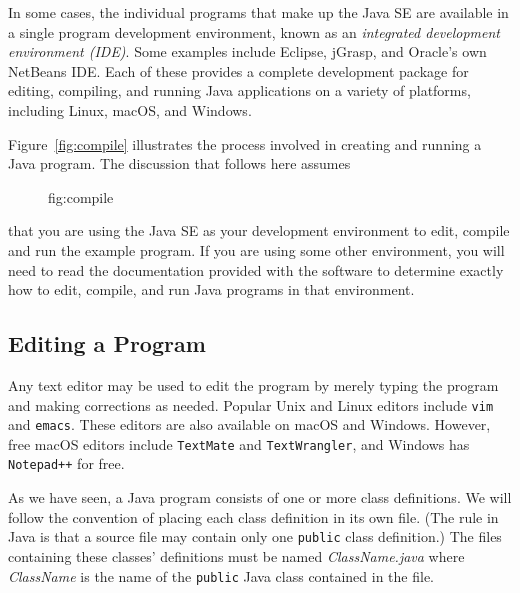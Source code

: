 In some cases, the individual programs that make up the Java SE are
available in a single program development environment, known as an
{\it integrated development environment (IDE)}. Some examples include
Eclipse, jGrasp, and Oracle's own NetBeans
IDE.  Each of these provides a complete development package for
editing, compiling, and running Java applications on
a variety of platforms, including Linux, macOS, and Windows.

Figure~\ref{fig:compile} illustrates the process involved in creating
and running a Java program.  The discussion that follows here assumes
\begin{figure}[tb]
\figaleft{chptr01/compile.eps}{Editing, compiling, and running
{\tt HelloWorld.java}.
} {fig:compile}

\end{figure}
that you are using the Java SE as your development environment to edit,
compile and run the example program.  If you are using some other
environment, you will need to read the documentation provided with the
software to determine exactly how to edit, compile, and run Java
programs in that environment.


\subsection{Editing a Program}

\noindent Any text editor may be used to edit the program by
merely typing the program and making corrections as needed.  Popular
Unix and Linux editors include {\tt vim} and {\tt emacs}. These
editors are also available on macOS and Windows. However, free macOS
editors include {\tt TextMate} and {\tt TextWrangler}, and Windows has
{\tt Notepad++} for free.  

As we have seen, a Java program consists of one or more class
definitions.  We will follow the convention of placing each class
definition in its own file. (The rule in Java is that a source file
may contain only one {\tt public} class definition.)  The files
containing these classes' definitions must be named {\it
ClassName.java} where {\it ClassName} is the name of the {\tt public}
Java class contained in the file.


